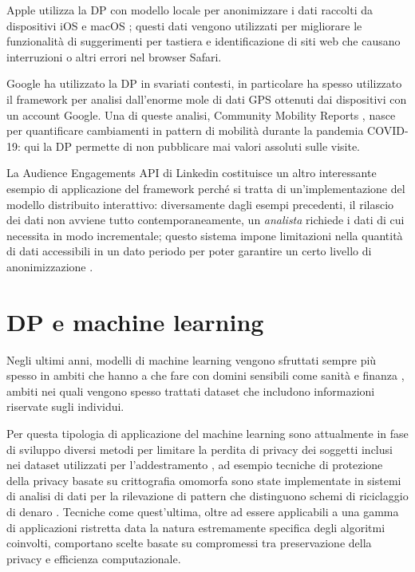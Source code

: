 Apple utilizza la DP con modello locale per anonimizzare i dati raccolti da dispositivi iOS e macOS \cite{appledpatscale}; questi dati vengono utilizzati per migliorare le funzionalità di suggerimenti per tastiera e identificazione di siti web che causano interruzioni o altri errori nel browser Safari.

Google ha utilizzato la DP in svariati contesti, in particolare ha spesso utilizzato il framework per analisi dall'enorme mole di dati GPS ottenuti dai dispositivi con un account Google. Una di queste analisi, Community Mobility Reports \cite{googlecovid19communitymobility}, nasce per quantificare cambiamenti in pattern di mobilità durante la pandemia COVID-19: qui la DP permette di non pubblicare mai valori assoluti sulle visite.

La Audience Engagements API di Linkedin costituisce un altro interessante esempio di applicazione del framework perché si tratta di un'implementazione del modello distribuito interattivo: diversamente dagli esempi precedenti, il rilascio dei dati non avviene tutto contemporaneamente, un \textit{analista} richiede i dati di cui necessita in modo incrementale; questo sistema impone limitazioni nella quantità di dati accessibili in un dato periodo per poter garantire un certo livello di anonimizzazione \cite{rogers2020linkedinsaudienceengagementsapi}.

\section{DP e machine learning}
Negli ultimi anni, modelli di machine learning vengono sfruttati sempre più spesso in ambiti che hanno a che fare con domini sensibili come sanità \cite{mlHealthcareSOA} e finanza \cite{llmFinanceTrends}, ambiti nei quali vengono spesso trattati dataset che includono informazioni riservate sugli individui.

Per questa tipologia di applicazione del machine learning sono attualmente in fase di sviluppo diversi metodi per limitare la perdita di privacy dei soggetti inclusi nei dataset utilizzati per l'addestramento \cite{privacyTechMlFinInt} \cite{mlHealthcareFuture}, ad esempio tecniche di protezione della privacy basate su crittografia omomorfa sono state implementate in sistemi di analisi di dati per la rilevazione di pattern che distinguono schemi di riciclaggio di denaro \cite{privacyMlFinanceHomomorphicEnc}. Tecniche come quest'ultima, oltre ad essere applicabili a una gamma di applicazioni ristretta data la natura estremamente specifica degli algoritmi coinvolti, comportano scelte basate su compromessi tra preservazione della privacy e efficienza computazionale.

